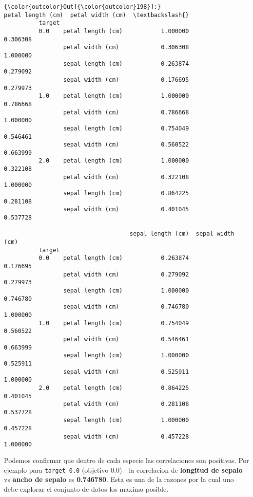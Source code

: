 \documentclass[11pt]{article}
\begin{document}
\begin{Verbatim}[commandchars=\\\{\}]
{\color{outcolor}Out[{\color{outcolor}198}]:}                           petal length (cm)  petal width (cm)  \textbackslash{}
          target                                                          
          0.0    petal length (cm)           1.000000          0.306308   
                 petal width (cm)            0.306308          1.000000   
                 sepal length (cm)           0.263874          0.279092   
                 sepal width (cm)            0.176695          0.279973   
          1.0    petal length (cm)           1.000000          0.786668   
                 petal width (cm)            0.786668          1.000000   
                 sepal length (cm)           0.754049          0.546461   
                 sepal width (cm)            0.560522          0.663999   
          2.0    petal length (cm)           1.000000          0.322108   
                 petal width (cm)            0.322108          1.000000   
                 sepal length (cm)           0.864225          0.281108   
                 sepal width (cm)            0.401045          0.537728   
          
                                    sepal length (cm)  sepal width (cm)  
          target                                                         
          0.0    petal length (cm)           0.263874          0.176695  
                 petal width (cm)            0.279092          0.279973  
                 sepal length (cm)           1.000000          0.746780  
                 sepal width (cm)            0.746780          1.000000  
          1.0    petal length (cm)           0.754049          0.560522  
                 petal width (cm)            0.546461          0.663999  
                 sepal length (cm)           1.000000          0.525911  
                 sepal width (cm)            0.525911          1.000000  
          2.0    petal length (cm)           0.864225          0.401045  
                 petal width (cm)            0.281108          0.537728  
                 sepal length (cm)           1.000000          0.457228  
                 sepal width (cm)            0.457228          1.000000  
\end{Verbatim}
            
    Podemos confirmar que dentro de cada especie las correlaciones son
positivas. Por ejemplo para \texttt{target\ 0.0} (objetivo 0.0) - la
correlacion de \textbf{longitud de sepalo} vs \textbf{ancho de sepalo}
es \textbf{0.746780}. Esta es una de la razones por la cual uno debe
explorar el conjunto de datos los maximo posible.
\end{document}

